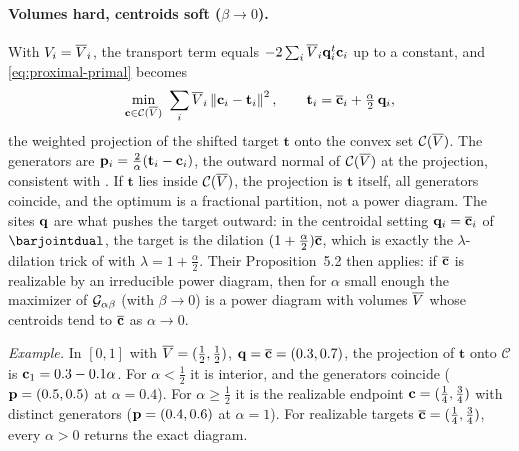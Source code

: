\documentclass[main.tex]{subfiles}
\providecommand{\momset}{\mathcal{M}}            %
\providecommand{\convset}{\mathcal{C}}           %
\providecommand{\regdual}{\jointdual_{\alpha\beta}} %
\providecommand{\tgt}{\mathbf{t}}                %
\begin{document}
\paragraph{Volumes hard, centroids soft ($\beta \to 0$).}
With $V_i = \overline{V}_i$, the transport term equals $-2\sum_i \overline{V}_i \mathbf{q}_i^{t} \mathbf{c}_i$ up to a constant, and \eqref{eq:proximal-primal} becomes
\begin{equation}
  \min_{\centroid \in \convset(\pvol)} \ \sum_i \pvol_i \norm{\centroid_i - \tgt_i}^2 ,
  \qquad
  \tgt_i = \tcentroid_i + \tfrac{\alpha}{2}\,\qq_i ,
  \label{eq:volume-hard-projection}
\end{equation}
the weighted projection of the shifted target $\tgt$ onto the convex set $\convset(\pvol)$.
The generators are $\dual_i = \tfrac{2}{\alpha}(\tgt_i - \centroid_i)$, \ie the outward normal of $\convset(\pvol)$ at the projection, consistent with \citet[Lemma~4.1]{Bourne2026ConvexOrder}.
If $\tgt$ lies inside $\convset(\pvol)$, the projection is $\tgt$ itself, all generators coincide, and the optimum is a fractional partition, not a power diagram.
The sites $\mathbf{q}$ are what pushes the target outward: in the centroidal setting $\mathbf{q}_i = \overline{\mathbf{c}}_i$ of $\barjointdual$, the target is the dilation $(1 + \tfrac{\alpha}{2})\overline{\mathbf{c}}$, which is exactly the $\lambda$-dilation trick of \citet[\S5.2]{Bourne2026ConvexOrder} with $\lambda = 1 + \tfrac{\alpha}{2}$.
Their Proposition~5.2 then applies: if $\overline{\mathbf{c}}$ is realizable by an irreducible power diagram, then for $\alpha$ small enough the maximizer of $\regdual$ (with $\beta \to 0$) is a power diagram with volumes $\overline{V}$ whose centroids tend to $\overline{\mathbf{c}}$ as $\alpha \to 0$.

\emph{Example.}
In $[0,1]$ with $\overline{V} = (\tfrac12, \tfrac12)$, $\mathbf{q} = \overline{\mathbf{c}} = (0.3, 0.7)$, the projection of $\tgt$ onto $\convset$ is $\mathbf{c}_1 = 0.3 - 0.1\alpha$.
For $\alpha < \tfrac12$ it is interior, and the generators coincide ($\mathbf{p} = (0.5, 0.5)$ at $\alpha = 0.4$).
For $\alpha \ge \tfrac12$ it is the realizable endpoint $\mathbf{c} = (\tfrac14, \tfrac34)$ with distinct generators ($\mathbf{p} = (0.4, 0.6)$ at $\alpha = 1$).
For realizable targets $\overline{\mathbf{c}} = (\tfrac14, \tfrac34)$, every $\alpha > 0$ returns the exact diagram.
\end{document}
